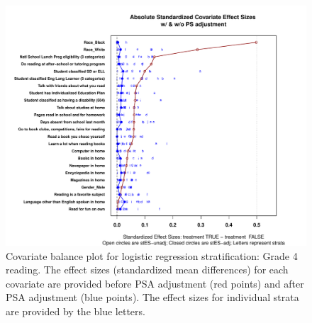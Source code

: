 \begin{figure}
\begin{center}
\includegraphics[width=\textwidth]{../Figures2009/g4read-lr-balance.pdf}
\caption[Covariate balance plot for logistic regression stratification: Grade 4 reading]{Covariate balance plot for logistic regression stratification: Grade 4 reading. The effect sizes (standardized mean differences) for each covariate are provided before PSA adjustment (red points) and after PSA adjustment (blue points). The effect sizes for individual strata are provided by the blue letters.}
\end{center}
\end{figure}

